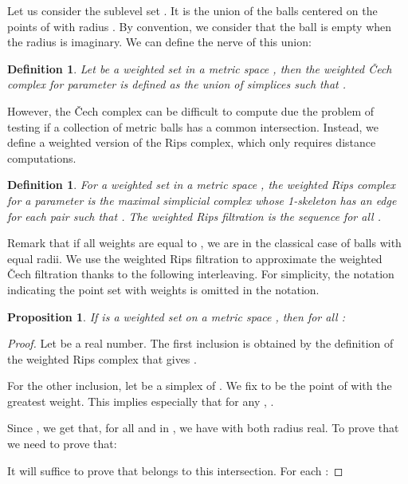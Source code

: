 \documentclass[a4paper]{article}
\newtheorem{definition}[theorem]{Definition}
\newtheorem{proposition}[theorem]{Proposition}
\begin{document}
Let us consider the sublevel set .
It is the union of the balls centered on the points  of  with radius .
By convention, we consider that the ball is empty when the radius is imaginary.
We can define the nerve of this union:

\begin{definition}
Let  be a weighted set in a metric space , then the \emph{weighted \v Cech complex}  for parameter  is defined as the union of simplices  such that .
\end{definition}

  However, the \v Cech complex can be difficult to compute due the problem of testing if a collection of metric balls has a common intersection.
  Instead, we define a weighted version of the Rips complex, which only requires distance computations.

  \begin{definition}
  For a weighted set  in a metric space , the \emph{weighted Rips complex}  for a parameter  is the maximal simplicial complex whose 1-skeleton has an edge for each pair  such that .
  The \emph{weighted Rips filtration} is the sequence  for all .
  \end{definition}

Remark that if all weights are equal to , we are in the classical case of balls with equal radii.
We use the weighted Rips filtration to approximate the weighted \v{C}ech filtration thanks to the following interleaving.
For simplicity, the notation  indicating the point set  with weights  is omitted in the notation.

\begin{proposition}
If  is a weighted set on a metric space , then for all :

\end{proposition}

\begin{proof}
Let  be a real number.
The first inclusion is obtained by the definition of the weighted Rips complex that gives .

For the other inclusion, let  be a simplex of .
We fix  to be the point of  with the greatest weight. 
This implies especially that for any , .

Since , we get that, for all  and  in , we have  with both radius real.
To prove that  we need to prove that:


It will suffice to prove that  belongs to this intersection.
For each :

\end{proof}
\end{document}
